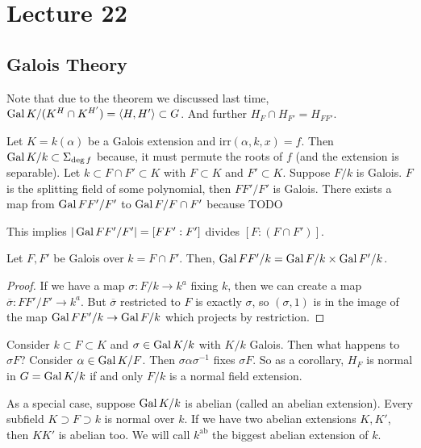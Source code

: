\section{Lecture 22}
\subsection{Galois Theory}
Note that due to the theorem we
discussed last time, $\operatorname{Gal} K/(K^H \cap K^{H'}) = \langle H, H' \rangle \subset G$.
And further $H_F \cap H_{F'} = H_{FF'}$.

Let $K = k(\alpha)$ be a Galois extension and $\text{irr}(\alpha, k, x) = f$.
Then $\operatorname{Gal} K/k \subset \Sigma_{\deg f}$ because, 
it must permute the roots of $f$ (and the
extension is separable). Let $k \subset F \cap F' \subset K$
with $F \subset K$ and $F' \subset K$. Suppose $F/k$ is Galois.
$F$ is the splitting field of some polynomial, then $FF'/F'$ is Galois.
There exists a map from $\operatorname{Gal} FF'/F'$ to $\operatorname{Gal} F/F\cap F'$
because TODO

This implies $|\operatorname{Gal} FF'/F'| = [FF' : F']$ divides $[F: (F\cap F')]$.

\begin{theorem}
    Let $F, F'$ be Galois over $k = F \cap F'$. Then, $\operatorname{Gal} FF'/k = \operatorname{Gal} F/k \times \operatorname{Gal} F'/k$.
    \begin{proof}
        If we have a map $\sigma : F/k \to k^a$ fixing $k$, then
        we can create a map $\overline{\sigma}: FF'/F' \to k^a$. But $\overline{\sigma}$ restricted to $F$
        is exactly $\sigma$, so $(\sigma, 1)$ is in the image of the map  $\operatorname{Gal} FF'/k \to \operatorname{Gal} F/k$
        which projects by restriction.
    \end{proof}
\end{theorem}

Consider $k \subset F \subset K$ and $\sigma \in \operatorname{Gal} K/k$ with $K/k$ Galois. Then what happens to $\sigma F$?
Consider $\alpha \in \operatorname{Gal} K/F$. Then $\sigma \alpha \sigma^{-1}$ fixes $\sigma F$. So
as a corollary, $H_F$ is normal in $G = \operatorname{Gal} K/k$ if and only $F/k$ is a normal field extension.

As a special case, suppose $\operatorname{Gal} K/k$ is abelian (called an abelian extension). Every subfield $K \supset F \supset k$ is normal over $k$.
If we have two abelian extensions $K, K'$, then $KK'$ is abelian too.
We will call $k^{\text{ab}}$ the biggest abelian extension of $k$.

